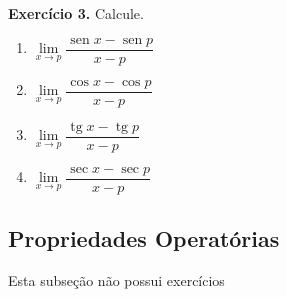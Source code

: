 \documentclass[12pt,a4paper]{article}
\begin{document}
\vspace{0.5cm}
\noindent\textbf{Exercício 3.} Calcule.
\begin{enumerate}
    \renewcommand{\theenumi}{\alph{enumi}}
    \renewcommand{\labelenumi}{\theenumi)}
    \item $\lim\limits_{x \to p} \dfrac{\operatorname{sen} x - \operatorname{sen} p}{x - p}$
    \item $\lim\limits_{x \to p} \dfrac{\cos x - \cos p}{x - p}$
    \item $\lim\limits_{x \to p} \dfrac{\operatorname{tg} x - \operatorname{tg} p}{x - p}$
    \item $\lim\limits_{x \to p} \dfrac{\sec x - \sec p}{x - p}$
\end{enumerate}

\subsection{Propriedades Operatórias}
Esta subseção não possui exercícios
\end{document}

